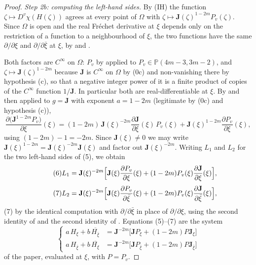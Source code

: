 \begin{proof}
\emph{Step 2b: computing the left-hand sides.}  By (IH) the function
$\zeta\mapsto D^{v}\chi(H(\zeta))$ agrees at every point of $\Omega$ with
$\zeta\mapsto\mathbf{J}(\zeta)^{1-2m}P_{v}(\zeta)$.  Since $\Omega$ is open and
the real Fr\'echet derivative at $\xi$ depends only on the restriction of a
function to a neighbourhood of $\xi$, the two functions have the same
$\partial/\partial\xi$ and $\partial/\partial\bar\xi$ at $\xi$, by 
and .

Both factors are $C^\infty$ on $\Omega$: $P_{v}$ by 
applied to $P_{v}\in\mathbb{P}(4m-3,3m-2)$, and $\zeta\mapsto\mathbf{J}(\zeta)^{1-2m}$
because $\mathbf{J}$ is $C^\infty$ on $\Omega$ by (0c) and non-vanishing there
by hypothesis (c), so that a negative integer power of it is a finite product
of copies of the $C^\infty$ function $1/\mathbf{J}$.  In particular both are
real-differentiable at $\xi$.  By  and then
 applied to $g=\mathbf{J}$ with exponent $a=1-2m$
(legitimate by (0c) and hypothesis (c)),
\[
  \frac{\partial\bigl(\mathbf{J}^{1-2m}P_{v}\bigr)}{\partial\xi}(\xi)
  =(1-2m)\,\mathbf{J}(\xi)^{-2m}\frac{\partial\mathbf{J}}{\partial\xi}(\xi)\,P_{v}(\xi)
   +\mathbf{J}(\xi)^{1-2m}\frac{\partial P_{v}}{\partial\xi}(\xi),
\]
using $(1-2m)-1=-2m$.  Since $\mathbf{J}(\xi)\neq0$ we may write
$\mathbf{J}(\xi)^{1-2m}=\mathbf{J}(\xi)^{-2m}\mathbf{J}(\xi)$ and factor out
$\mathbf{J}(\xi)^{-2m}$.  Writing $L_1$ and $L_2$ for the two left-hand sides
of (5), we obtain
\begin{equation}\tag{6}
  L_1=\mathbf{J}(\xi)^{-2m}\Bigl[\mathbf{J}(\xi)\frac{\partial P_{v}}{\partial\xi}(\xi)
      +(1-2m)P_{v}(\xi)\frac{\partial\mathbf{J}}{\partial\xi}(\xi)\Bigr],
\end{equation}
\begin{equation}\tag{7}
  L_2=\mathbf{J}(\xi)^{-2m}\Bigl[\mathbf{J}(\xi)\frac{\partial P_{v}}{\partial\bar\xi}(\xi)
      +(1-2m)P_{v}(\xi)\frac{\partial\mathbf{J}}{\partial\bar\xi}(\xi)\Bigr],
\end{equation}
(7) by the identical computation with $\partial/\partial\bar\xi$ in place of
$\partial/\partial\xi$, using the second identity of
 and the second identity of
.  Equations (5)--(7) are the system
\[
  \left\{
  \begin{aligned}
    a\,H_\xi+b\,\overline{H_{\bar\xi}}&=\mathbf{J}^{-2m}\bigl[\mathbf{J}P_\xi+(1-2m)P\mathbf{J}_\xi\bigr]\\
    a\,H_{\bar\xi}+b\,\overline{H_\xi}&=\mathbf{J}^{-2m}\bigl[\mathbf{J}P_{\bar\xi}+(1-2m)P\mathbf{J}_{\bar\xi}\bigr]
  \end{aligned}
  \right.
\]
of the paper, evaluated at $\xi$, with $P=P_v$.


\end{proof}

